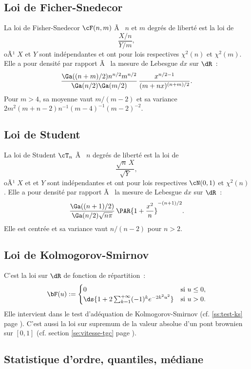 {{%
\subsection{Loi de Ficher-Snedecor}\label{ss:loi:fisher-snedecor}
%

La loi de Fisher-Snedecor $\cF(n,m)$ Ã  $n$ et $m$ degrés de liberté est la loi
de
$$
\frac{X/n}{Y/m},
$$
oÃ¹ $X$ et $Y$ sont indépendantes et ont pour lois respectives $\chi^2(n)$
et $\chi^2(m)$. Elle a pour densité par rapport Ã  la mesure de Lebesgue $dx$
sur $\dR$~:
$$
\frac{\Ga((n+m)/2) n^{n/2}
  m^{n/2}}{\Ga(n/2)\Ga(m/2)}\,\frac{x^{n/2-1}}{(m+nx)^{(n+m)/2}}.
$$
Pour $m>4$, sa moyenne vaut $m/(m-2)$ et sa variance
$2m^2(m+n-2)n^{-1}(m-4)^{-1}(m-2)^{-2}$.

%
\subsection{Loi de Student}\label{ss:loi:student}
%

La loi de Student $\cT_n$ Ã  $n$ degrés de liberté est la loi de
$$
\frac{\sqrt{n}\,X}{\sqrt{Y}},
$$
oÃ¹ $X$ et et $Y$ sont indépendantes et ont pour lois respectives $\cN(0,1)$
et $\chi^2(n)$. Elle a pour densité par rapport Ã  la mesure de Lebesgue $dx$ sur
$\dR$~:
$$
\frac{\Ga((n+1)/2)}{\Ga(n/2)\sqrt{n\pi}}\,\PAR{1+\frac{x^2}{n}}^{-(n+1)/2}.
$$
Elle est centrée et sa variance vaut $n/(n-2)$ pour $n>2$.

%
\subsection{Loi de Kolmogorov-Smirnov}\label{ss:loi:kolmogorov-smirnov}
%

C'est la loi sur $\dR$ de fonction de répartition~:
$$
\bF(u):=
\begin{cases}
  0 & \text{si } u\leq0,\\
  \ds{1+2 \sum_{k=1}^{+\infty} (-1)^k e^{-2k^2u^2}} & \text{si } u>0.
\end{cases}
$$
Elle intervient dans le test d'adéquation de Kolmogorov-Smirnov (cf.
\ref{ss:test-ks} page \pageref{ss:test-ks}). C'est aussi la loi sur supremum
de la valeur absolue d'un pont brownien sur $[0,1]$ (cf. section
\ref{se:vitesse-tgc} page \pageref{se:vitesse-tgc}).

%
\subsection{Statistique d'ordre, quantiles, médiane}\label{ss:loi:statordre}
%

}}
